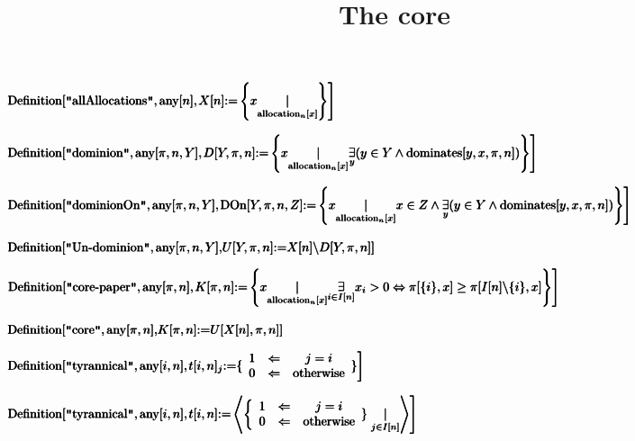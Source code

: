 \documentclass{article}
\begin{document}
\title{The core}
\author{}
\date{}
\maketitle

\noindent\(\pmb{}\\
\pmb{\text{Definition}[\text{$\texttt{"}$allAllocations$\texttt{"}$}, \text{any}[n],}\\
\pmb{\left.X[n] \text{:=}\left\{x\underset{\text{allocation}_n[x]}{|}\right\}\right]}\)

\noindent\(\pmb{\text{Definition}[\text{$\texttt{"}$dominion$\texttt{"}$}, \text{any}[\pi ,n,Y],}\\
\pmb{\left.D[Y,\pi ,n]\text{:=}\left\{x\underset{\text{allocation}_n[x]}{|}\underset{y}{\exists }(y\in Y\land \text{dominates}[y,x,\pi ,n])\right\}\right]}\)

\noindent\(\pmb{\text{Definition}[\text{$\texttt{"}$dominionOn$\texttt{"}$}, \text{any}[\pi ,n,Y],}\\
\pmb{\left.\text{DOn}[Y,\pi ,n,Z]\text{:=}\left\{x\underset{\text{allocation}_n[x]}{|}x\in Z\land \underset{y}{\exists }(y\in Y\land \text{dominates}[y,x,\pi
,n])\right\}\right]}\)

\noindent\(\pmb{\text{Definition}[\text{$\texttt{"}$Un-dominion$\texttt{"}$}, \text{any}[\pi ,n,Y],}\\
\pmb{U[Y,\pi ,n] \text{:=} X[n]\backslash D[Y,\pi ,n]]}\)

\noindent\(\pmb{\text{Definition}[\text{$\texttt{"}$core-paper$\texttt{"}$},\text{any}[\pi ,n],}\\
\pmb{\left.K[\pi ,n] \text{:=} \left\{x\underset{\text{allocation}_n[x]}{|}\underset{i\in I[n]}{\exists }x_i>0 \Leftrightarrow  \pi [\{i\},x] \geq
 \pi [I[n]\backslash  \{i\},x]\right\}\right]}\)

\noindent\(\pmb{\text{Definition}[\text{$\texttt{"}$core$\texttt{"}$},\text{any}[\pi ,n],}\\
\pmb{K[\pi ,n] \text{:=} U[X[n],\pi ,n]]}\)

\noindent\(\pmb{\text{Definition}[\text{$\texttt{"}$tyrannical$\texttt{"}$},\text{any}[i,n],}\\
\pmb{\left.t[i,n]_j\text{:=}\{
\begin{array}{ccc}
 1 & \Leftarrow  & j=i \\
 0 & \Leftarrow  & \text{otherwise}
\end{array}
\} \right]}\)

\noindent\(\pmb{\text{Definition}[\text{$\texttt{"}$tyrannical$\texttt{"}$},\text{any}[i,n],}\\
\pmb{\left.t[i,n]\text{:=}\left\langle \left\{
\begin{array}{ccc}
 1 & \Leftarrow  & j=i \\
 0 & \Leftarrow  & \text{otherwise}
\end{array}
\}\right. \underset{j\in I[n]}{|}\right\rangle \right]}\)
\end{document}
